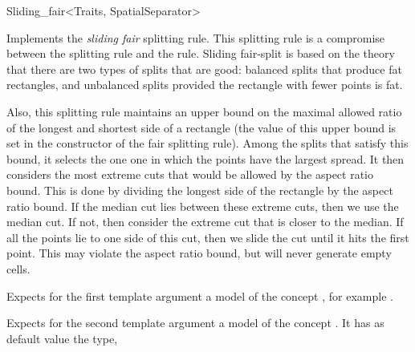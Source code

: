 

\begin{ccRefFunctionObjectClass}{Sliding_fair<Traits, SpatialSeparator>}


\ccDefinition
Implements the {\em sliding fair} splitting rule.
This splitting rule is a compromise between the  splitting rule
and the  rule.  Sliding fair-split is based on the
theory that there are two types of splits that are good: balanced
splits that produce fat rectangles, and unbalanced splits provided the
rectangle with fewer points is fat.

Also, this splitting rule maintains an upper bound on the maximal
allowed ratio of the longest and shortest side of a rectangle (the
value of this upper bound is set in the constructor of the fair
splitting rule). Among the splits that satisfy this bound, it selects
the one one in which the points have the largest spread.  It then
considers the most extreme cuts that would be allowed by the aspect
ratio bound. This is done by dividing the longest side of the
rectangle by the aspect ratio bound. If the median cut lies between
these extreme cuts, then we use the median cut. If not, then consider
the extreme cut that is closer to the median.  If all the points lie
to one side of this cut, then we slide the cut until it hits the first
point.  This may violate the aspect ratio bound, but will never
generate empty cells.


\ccParameters

Expects for the first template argument a model of
the concept , 
for example . 

Expects for the second template argument a model of the concept . It has as default value
the type, 



\end{ccRefFunctionObjectClass}
